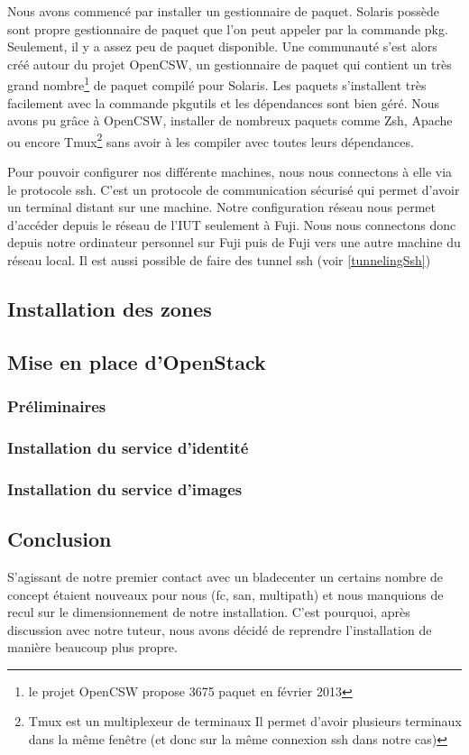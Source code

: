 \documentclass[a4paper,oneside]{report}
\begin{document}
Nous avons commencé par installer un gestionnaire de paquet.
Solaris possède sont propre gestionnaire de paquet que l'on peut appeler par la commande pkg. Seulement, il y a assez peu de paquet disponible.
Une communauté s'est alors créé autour du projet OpenCSW, un gestionnaire de paquet qui contient un très grand nombre\footnote{le projet OpenCSW propose 3675 paquet en février 2013} de paquet compilé pour Solaris.
Les paquets s'installent très facilement avec la commande pkgutils et les dépendances sont bien géré. Nous avons pu grâce à OpenCSW, installer de nombreux paquets comme Zsh, Apache ou encore Tmux\footnote{Tmux est un multiplexeur de terminaux
Il permet d'avoir plusieurs terminaux dans la même fenêtre (et donc sur la même connexion \gls{ssh} dans notre cas)} sans avoir à les compiler avec toutes leurs dépendances. 

Pour pouvoir configurer nos différente machines, nous nous connectons à elle via le protocole \gls{ssh}. 
C'est un protocole de communication sécurisé qui permet d'avoir un terminal distant sur une machine.
Notre configuration réseau nous permet d'accéder depuis le réseau de l'IUT seulement à Fuji.
Nous nous connectons donc depuis notre ordinateur personnel sur Fuji puis de Fuji vers une autre machine du réseau local.
Il est aussi possible de faire des tunnel \gls{ssh} (voir \ref{tunnelingSsh})

\subsection{Installation des zones}

\subsection{Mise en place d'OpenStack}
\subsubsection{Préliminaires}

\subsubsection{Installation du service d'identité}

\subsubsection{Installation du service d'images}

\subsection{Conclusion}
S'agissant de notre premier contact avec un \gls{bladecenter} un certains nombre de concept étaient nouveaux pour nous (\gls{fc}, \gls{san}, multipath) et nous manquions de recul sur le dimensionnement de notre installation.
C'est pourquoi, après discussion avec notre tuteur, nous avons décidé de reprendre l'installation de manière beaucoup plus propre.
\end{document}

